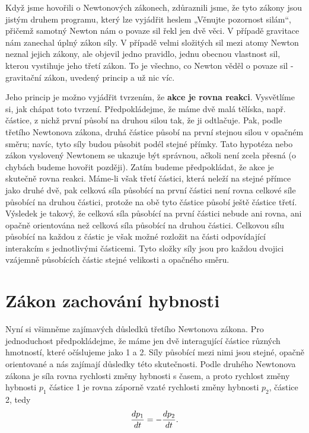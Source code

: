     Když jsme hovořili o Newtonových zákonech, zdůraznili jsme, že tyto zákony jsou jistým druhem 
    programu, který lze vyjádřit heslem „Věnujte pozornost silám“, přičemž samotný Newton nám o 
    povaze sil řekl jen dvě věci. V případě gravitace nám zanechal úplný zákon síly. V případě 
    velmi složitých sil mezi atomy Newton neznal jejich zákony, ale objevil jedno pravidlo, jednu 
    obecnou vlastnost sil, kterou vystihuje jeho třetí zákon. To je všechno, co Newton věděl o 
    povaze sil - gravitační zákon, uvedený princip a už nic víc.
    
    Jeho princip je možno vyjádřit tvrzením, že \textbf{akce je rovna reakci}. Vysvětlíme si, jak 
    chápat toto tvrzení. Předpokládejme, že máme dvě malá tělíska, např. částice, z nichž první 
    působí na druhou silou tak, že ji odtlačuje. Pak, podle třetího Newtonova zákona, druhá částice 
    působí na první stejnou silou v opačném směru; navíc, tyto síly budou působit podél stejné 
    přímky. Tato hypotéza nebo zákon vyslovený Newtonem se ukazuje být správnou, ačkoli není zcela 
    přesná (o chybách budeme hovořit později). Zatím budeme předpokládat, že akce je skutečně rovna 
    reakci. Máme-li však třetí částici, která neleží na stejné přímce jako druhé dvě, pak celková 
    síla působící na první částici není rovna celkové síle působící na druhou částici, protože na 
    obě tyto částice působí ještě částice třetí. Výsledek je takový, že celková síla působící na 
    první částici nebude ani rovna, ani opačně orientována než celková síla působící na druhou 
    částici. Celkovou sílu působící na každou z částic je však možné rozložit na části odpovídající 
    interakcím s jednotlivými částicemi. Tyto složky síly jsou pro každou dvojici vzájemně 
    působících částic stejné velikosti a opačného směru.
    
  \section{Zákon zachování hybnosti}
    Nyní si všimněme zajímavých důsledků třetího Newtonova zákona. Pro jednoduchost předpokládejme, 
    že máme jen dvě interagující částice různých hmotností, které očíslujeme jako 1 a 2. Síly 
    působící mezi nimi jsou stejné, opačně orientované a nás zajímají důsledky této skutečnosti. 
    Podle druhého Newtonova zákona je síla rovna rychlosti změny hybnosti s časem, a proto rychlost 
    změny hybnosti \(p_1\)  částice 1 je rovna záporně vzaté rychlosti změny hybnosti \(p_2\), 
    částice 2, tedy
    \begin{equation}\label{FYZ:eq136}
      \dfrac{d p_1}{d t} = - \dfrac{d p_2}{d t}.
    \end{equation}
    
